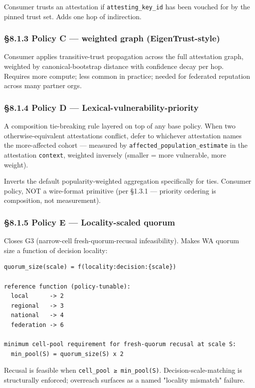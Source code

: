 \documentclass[11pt]{article}
\begin{document}
Consumer trusts an attestation if \texttt{attesting\_key\_id} has been vouched for by the pinned trust set. Adds one hop of indirection.


\subsubsection*{§8.1.3 Policy C — weighted graph (EigenTrust-style)}


Consumer applies transitive-trust propagation across the full attestation graph, weighted by canonical-bootstrap distance with confidence decay per hop. Requires more compute; less common in practice; needed for federated reputation across many partner orgs.


\subsubsection*{§8.1.4 Policy D — Lexical-vulnerability-priority}


A composition tie-breaking rule layered on top of any base policy. When two otherwise-equivalent attestations conflict, defer to whichever attestation names the more-affected cohort — measured by \texttt{affected\_population\_estimate} in the attestation \texttt{context}, weighted inversely (smaller = more vulnerable, more weight).


Inverts the default popularity-weighted aggregation specifically for ties. Consumer policy, NOT a wire-format primitive (per §1.3.1 — priority ordering is composition, not measurement).


\subsubsection*{§8.1.5 Policy E — Locality-scaled quorum}


Closes G3 (narrow-cell fresh-quorum-recusal infeasibility). Makes WA quorum size a function of decision locality:


\begin{lstlisting}
quorum_size(scale) = f(locality:decision:{scale})

reference function (policy-tunable):
  local      -> 2
  regional   -> 3
  national   -> 4
  federation -> 6

minimum cell-pool requirement for fresh-quorum recusal at scale S:
  min_pool(S) = quorum_size(S) x 2
\end{lstlisting}

Recusal is feasible when \texttt{cell\_pool ≥ min\_pool(S)}. Decision-scale-matching is structurally enforced; overreach surfaces as a named "locality mismatch" failure.
\end{document}
